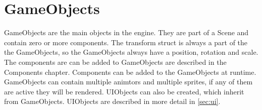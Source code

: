 \section{GameObjects}
\label{sec:gameObjects}
GameObjects are the main objects in the engine. They are part of a Scene and contain zero or more components.
The transform struct is always a part of the the GameObjects, so the GameObjects always have a position, rotation and scale.
The components are can be added to GameObjects are described in the Components chapter.
Components can be added to the GameObjects at runtime.
GameObjects can contain multiple animtors and multiple sprites, if any of them are active they will be rendered.
UIObjects can also be created, which inherit from GameObjects. UIObjects are described in more detail in \autoref{sec:ui}.
